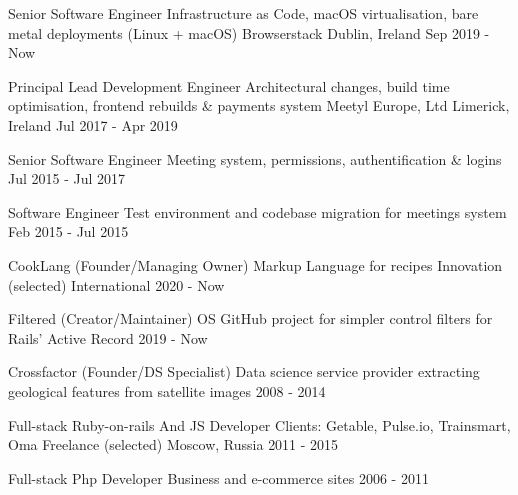 
\begin{cventries}

    \cvblitz
    {Senior Software Engineer} %
    {Infrastructure as Code, macOS virtualisation, bare metal deployments (Linux + macOS)}
    {Browserstack} %
    {Dublin, Ireland} %
    {Sep 2019 - Now} %

    \cvblitz
    {Principal Lead Development Engineer} %
    {Architectural changes, build time optimisation, frontend rebuilds \& payments system}
    {Meetyl Europe, Ltd} %
    {Limerick, Ireland} %
    {Jul 2017 - Apr 2019} %

    \cvblitz
    {Senior Software Engineer} %
    {Meeting system, permissions, authentification \& logins} %
    {} %
    {} %
    {Jul 2015 - Jul 2017} %

    \cvblitz
    {Software Engineer} %
    {Test environment and codebase migration for meetings system} %
    {} %
    {} %
    {Feb 2015 - Jul 2015} %

    \cvblitz
    {CookLang (Founder/Managing Owner)} %
    {Markup Language for recipes} %
    {Innovation (selected)} %
    {International} %
    {2020 - Now} %

    \cvblitz
    {Filtered (Creator/Maintainer)} %
    {OS GitHub project for simpler control filters for Rails’ Active Record} %
    {} %
    {} %
    {2019 - Now} %

    \cvblitz
    {Crossfactor (Founder/DS Specialist)} %
    {Data science service provider extracting geological features from satellite images} %
    {} %
    {} %
    {2008 - 2014} %

    \cvblitz
    {Full-stack Ruby-on-rails And JS Developer} %
    {Clients: Getable, Pulse.io, Trainsmart, Oma} %
    {Freelance (selected)} %
    {Moscow, Russia} %
    {2011 - 2015} %

    \cvblitz
    {Full-stack Php Developer} %
    {Business and e-commerce sites} %
    {} %
    {} %
    {2006 - 2011} %

\end{cventries}
